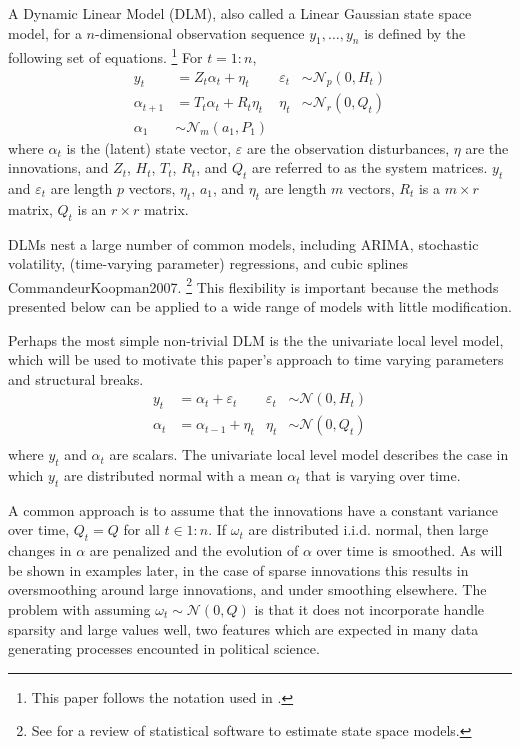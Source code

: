 \documentclass{article}
\newcommand{\paren}[1]{\ensuremath{\left(#1\right)}}
\newcommand{\dnorm}[1]{\ensuremath{\mathcal{N}\paren{#1}}}
\newcommand{\dmvnorm}[2]{\ensuremath{\mathcal{N}_{#2}\paren{#1}}}
\begin{document}
\begin{itemize}
A Dynamic Linear Model (DLM), also called a Linear Gaussian state space model, for a $n$-dimensional observation sequence $y_{1}, \dots, y_{n}$ is defined by the following set of equations.%
\footnote{This paper follows the notation used in \textcite{DurbinKoopman2001}.}
For $t = 1:n$,
\begin{align}
  \label{eq:8}
  y_t &= Z_{t} \alpha_t + \eta_t & \varepsilon_{t} &\sim \dmvnorm{0, H_{t}}{p} \\
  \label{eq:14}
  \alpha_{t+1} &= T_{t} \alpha_{t} + R_{t} \eta_{t} & \eta_{t} &\sim \dmvnorm{0, Q_{t}}{r} \\
  \label{eq:2}
  \alpha_{1} & \sim \dmvnorm{a_{1}, P_{1}}{m}
\end{align}
where $\alpha_{t}$ is the (latent) state vector, 
$\varepsilon$ are the observation disturbances, 
$\eta$ are the innovations, 
and $Z_{t}$, $H_{t}$, $T_{t}$, $R_{t}$, and $Q_{t}$ are referred to as the system matrices.
$y_{t}$ and $\varepsilon_{t}$ are length $p$ vectors,
$\eta_{t}$, $a_{1}$, and $\eta_{t}$ are length $m$ vectors,
$R_{t}$ is a $m \times r$ matrix, $Q_{t}$ is an $r \times r$ matrix.

DLMs nest a large number of common models, including ARIMA, stochastic volatility, (time-varying parameter) regressions,
and cubic splines \parencites{WestHarrison1997}{DurbinKoopman2001}\parencite{PetrisPetroneEtAl2009}{CommandeurKoopman2007}.%
\footnote{See \textcite{CommandeurKoopmanOoms2011} for a review of statistical software to estimate state space models.}
This flexibility is important because the methods presented below can be applied to a wide range of models with little modification.

Perhaps the most simple non-trivial DLM is the the univariate local level model, which will be used to motivate this paper's approach to time varying parameters and structural breaks.
\begin{align}
  \label{eq:15}
  y_t &= \alpha_t + \varepsilon_t & \varepsilon_{t} &\sim \dnorm{0, H_{t}} \\
  \label{eq:16}
  \alpha_t &= \alpha_{t-1} + \eta_{t} & \eta_{t} &\sim \dnorm{0, Q_{t}} \\
\end{align}
where $y_{t}$ and $\alpha_{t}$ are scalars.
The univariate local level model describes the case in which $y_{t}$ are distributed normal with a mean $\alpha_{t}$ that is varying over time.

A common approach is to assume that the innovations have a constant variance over time, $Q_{t} = Q$  for all $t \in 1:n$.
If $\omega_{t}$ are distributed i.i.d. normal, then large changes in $\alpha$ are penalized and the evolution of $\alpha$ over time is smoothed.
As will be shown in examples later, in the case of sparse innovations this results in oversmoothing around large innovations, and under smoothing elsewhere.
The problem with assuming $\omega_{t} \sim \dnorm{0, Q}$ is that it does not incorporate handle sparsity and large values well, two features which are expected in many data generating processes encounted in political science.



\end{itemize}
\end{document}
